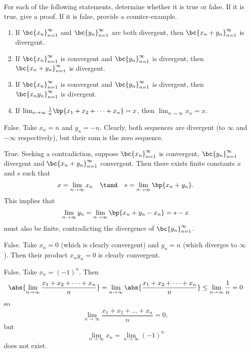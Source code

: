 \begin{problem}
    For each of the following statements, determine whether it is true or false. If it is true, give a proof. If it is false, provide a counter-example.
    \begin{enumerate}
        \item If $\bc{x_n}_{n=1}^\infty$ and $\bc{y_n}_{n=1}^\infty$ are both divergent, then $\bc{x_n + y_n}_{n=1}^\infty$ is divergent.
        \item If $\bc{x_n}_{n=1}^\infty$ is convergent and $\bc{y_n}_{n=1}^\infty$ is divergent, then $\bc{x_n + y_n}_{n=1}^\infty$ is divergent.
        \item If $\bc{x_n}_{n=1}^\infty$ is convergent and $\bc{y_n}_{n=1}^\infty$ is divergent, then $\bc{x_n y_n}_{n=1}^\infty$ is divergent.
        \item If $\lim_{n \to \infty} \frac1n \bp{x_1 + x_2 + \dots + x_n} = x$, then $\lim_{n \to \infty} x_n = x$.
    \end{enumerate}
\end{problem}
\begin{solution}
    \begin{ppart}
        False. Take $x_n = n$ and $y_n = -n$. Clearly, both sequences are divergent (to $\infty$ and $-\infty$ respectively), but their sum is the zero sequence.
    \end{ppart}
    \begin{ppart}
        True. Seeking a contradiction, suppose $\bc{x_n}_{n=1}^\infty$ is convergent, $\bc{y_n}_{n=1}^\infty$ divergent and $\bc{x_n + y_n}_{n=1}^\infty$ convergent. Then there exists finite constants $x$ and $s$ such that \[x = \lim_{n \to \infty} x_n \quad \tand \quad s = \lim_{n \to \infty} \bp{x_n + y_n}.\] This implies that \[\lim_{n \to \infty} y_n = \lim_{n \to \infty} \bp{x_n + y_n - x_n} = s - x\] must also be finite, contradicting the divergence of $\bc{y_n}_{n=1}^\infty$.
    \end{ppart}
    \begin{ppart}
        False. Take $x_n = 0$ (which is clearly convergent) and $y_n = n$ (which diverges to $\infty$). Then their product $x_n y_n = 0$ is clearly convergent.
    \end{ppart}
    \begin{ppart}
        False. Take $x_n = (-1)^n$. Then \[\abs{\lim_{n \to \infty} \frac{x_1 + x_2 + \dots + x_n}{n}} = \lim_{n \to \infty} \abs{\frac{x_1 + x_2 + \dots + x_n}{n}} \leq \lim_{n \to \infty} \frac1n = 0\] so \[\lim_{n \to \infty} \frac{x_1 + x_2 + \dots + x_n}{n} = 0,\] but \[\lim_{n \to \infty} x_n = \lim_{n \to \infty} (-1)^n\] does not exist.
    \end{ppart}
\end{solution}

